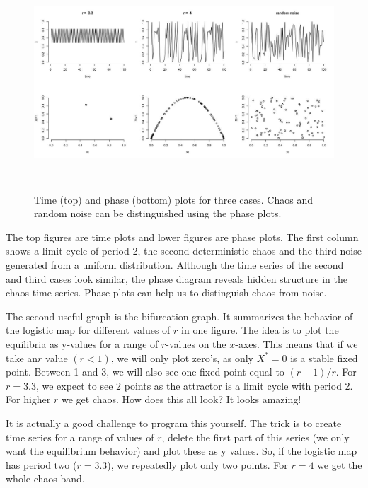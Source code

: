 \documentclass[
  letterpaper,
]{scrbook}
\begin{document}
\begin{figure}

{\centering \includegraphics[width=6.26389in,height=3.17778in]{media/ch2/image7.jpg}

}

\caption{\label{fig-ch2-img7}Time (top) and phase (bottom) plots for
three cases. Chaos and random noise can be distinguished using the phase
plots.}

\end{figure}

The top figures are time plots and lower figures are phase plots. The
first column shows a limit cycle of period 2, the second deterministic
chaos and the third noise generated from a uniform distribution.
Although the time series of the second and third cases look similar, the
phase diagram reveals hidden structure in the chaos time series. Phase
plots can help us to distinguish chaos from noise.

The second useful graph is the bifurcation graph. It summarizes the
behavior of the logistic map for different values of \(r\) in one
figure. The idea is to plot the equilibria as y-values for a range of
\(r\)-values on the \(x\)-axes. This means that if we take an\(r\) value
\((r < 1)\), we will only plot zero's, as only \(X^{*} = 0\) is a stable
fixed point. Between 1 and 3, we will also see one fixed point equal to
\((r - 1)/r\). For \(r = 3.3\), we expect to see 2 points as the
attractor is a limit cycle with period 2. For higher \(r\) we get chaos.
How does this all look? It looks amazing!

It is actually a good challenge to program this yourself. The trick is
to create time series for a range of values of \(r\), delete the first
part of this series (we only want the equilibrium behavior) and plot
these as y values. So, if the logistic map has period two (\(r = 3.3\)),
we repeatedly plot only two points. For \(r = 4\) we get the whole chaos
band.
\end{document}
